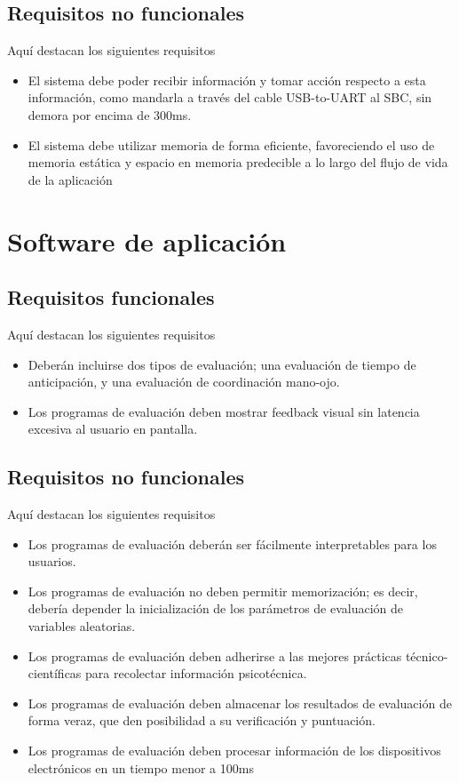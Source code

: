 \documentclass[12pt,a4paper,twoside,openright]{book}
\begin{document}
\subsection{Requisitos no funcionales}

Aquí destacan los siguientes requisitos

\begin{itemize}
  \item [RNF1] El sistema debe poder recibir información y tomar acción respecto a esta información, como mandarla a través del cable USB-to-UART al SBC, sin demora por encima de 300ms.
  \item [RNF2] El sistema debe utilizar memoria de forma eficiente, favoreciendo el uso de memoria estática y espacio en memoria predecible a lo largo del flujo de vida de la aplicación
\end{itemize}

\section{Software de aplicación}

\subsection{Requisitos funcionales}

Aquí destacan los siguientes requisitos

\begin{itemize}
  \item [RF1] Deberán incluirse dos tipos de evaluación; una evaluación de tiempo de anticipación, y una evaluación de coordinación mano-ojo.
  \item [RF2] Los programas de evaluación deben mostrar feedback visual sin latencia excesiva al usuario en pantalla.
\end{itemize}

\subsection{Requisitos no funcionales}

Aquí destacan los siguientes requisitos

\begin{itemize}
  \item [RNF1] Los programas de evaluación deberán ser fácilmente interpretables para los usuarios.
  \item [RNF2] Los programas de evaluación no deben permitir memorización; es decir, debería depender la inicialización de los parámetros de evaluación de variables aleatorias.
  \item [RNF3] Los programas de evaluación deben adherirse a las mejores prácticas técnico-científicas para recolectar información psicotécnica. 
  \item [RNF4] Los programas de evaluación deben almacenar los resultados de evaluación de forma veraz, que den posibilidad a su verificación y puntuación.
  \item [RNF5] Los programas de evaluación deben procesar información de los dispositivos electrónicos en un tiempo menor a 100ms

\end{itemize}
\end{document}
